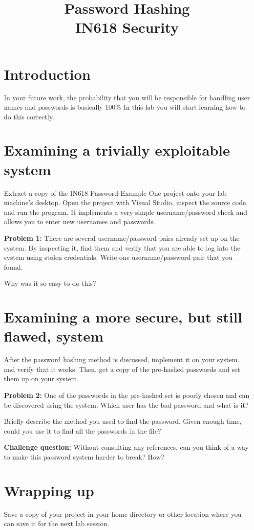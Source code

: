 \documentclass{article}
\begin{document}
\title{Password Hashing\\ IN618 Security}
\date{}
\maketitle

\section*{Introduction}
In your future work, the probability that you will be responsible for handling user names and passwords is basically 100\%
In this lab you will start learning how to do this correctly.

\section{Examining a trivially exploitable system}
Extract a copy of the IN618-Password-Example-One project onto your lab machine's desktop.  Open the project 
with Visual Studio, inspect the source code, and run the program.  It implements a very simple username/password 
check and allows you to enter new usernames and passwords.

\textbf{Problem 1:} There are several username/password pairs already set up on the system.  By inspecting it,
find them and verify that you are able to log into the system using stolen credentials.  Write one username/password
pair that you found.

\vspace{25mm}

Why was it so easy to do this?

\newpage      

\section{Examining a more secure, but still flawed, system}
After the password hashing method is discussed, implement it on your system. and verify that it works.  Then, get a copy 
of the pre-hashed passwords and set them up on your system.

\textbf{Problem 2:} One of the passwords in the pre-hashed set is poorly chosen and can be discovered using the system.
Which user has the bad password and what is it?

\vspace{25mm}

Briefly describe the method you used to find the password.  Given enough time, could you use it to find all 
the passwords in the file?  

\vspace{200mm}

\textbf{Challenge question:} Without consulting any references, can you think of a way to make this 
password system harder to break? How?


\vspace{50mm}

\section{Wrapping up}
Save a copy of your project in your home directory or other location where you can save it for the next lab session.
\end{document}
